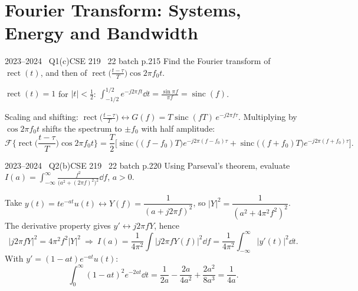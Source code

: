 \renewcommand{\teacherTag}{ANIK SIR \textbullet\ LECTURES 11--14}
\chapter{Fourier Transform: Systems, Energy and Bandwidth}


\begin{qcard}{2023--2024 \textbullet\ Q1(c)}{CSE 219 \textbullet\ 22 batch p.2}{15}
Find the Fourier transform of $\operatorname{rect}(t)$, and then of $\operatorname{rect}\!\big(\frac{t-\tau}{T}\big)\cos2\pi f_0t$.
\end{qcard}
\begin{solution}
$\operatorname{rect}(t)=1$ for $|t|<\frac12$: $\displaystyle\int_{-1/2}^{1/2}e^{-j2\pi ft}\dd t=\frac{\sin\pi f}{\pi f}=\operatorname{sinc}(f)$.

Scaling and shifting: $\operatorname{rect}\big(\frac{t-\tau}T\big)\leftrightarrow G(f)=T\operatorname{sinc}(fT)\,e^{-j2\pi f\tau}$. Multiplying by $\cos2\pi f_0t$ shifts the spectrum to $\pm f_0$ with half amplitude:
\[
\mathcal F\Big\{\operatorname{rect}\Big(\frac{t-\tau}T\Big)\cos2\pi f_0t\Big\}=\frac T2\Big[\operatorname{sinc}\big((f-f_0)T\big)e^{-j2\pi(f-f_0)\tau}+\operatorname{sinc}\big((f+f_0)T\big)e^{-j2\pi(f+f_0)\tau}\Big].
\]
\end{solution}

\begin{qcard}{2023--2024 \textbullet\ Q2(b)}{CSE 219 \textbullet\ 22 batch p.2}{20}
Using Parseval's theorem, evaluate $I(a)=\displaystyle\int_{-\infty}^{\infty}\frac{f^2}{\big(a^2+(2\pi f)^2\big)^2}\dd f$, $a>0$.
\end{qcard}
\begin{solution}
Take $y(t)=te^{-at}u(t)\leftrightarrow Y(f)=\dfrac1{(a+j2\pi f)^2}$, so $|Y|^2=\dfrac1{(a^2+4\pi^2f^2)^2}$. The derivative property gives $y'\leftrightarrow j2\pi fY$, hence
\[|j2\pi fY|^2=4\pi^2f^2|Y|^2\ \Rightarrow\ I(a)=\frac1{4\pi^2}\int|j2\pi fY(f)|^2\dd f=\frac1{4\pi^2}\int_{-\infty}^\infty|y'(t)|^2\dd t .\]
With $y'=(1-at)e^{-at}u(t)$:
\[\int_0^\infty(1-at)^2e^{-2at}\dd t=\frac1{2a}-\frac{2a}{4a^2}+\frac{2a^2}{8a^3}=\frac1{4a}.\]
\end{solution}

